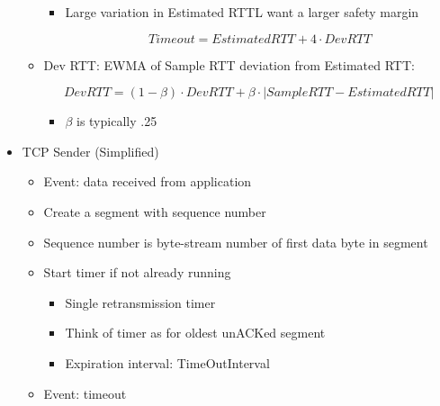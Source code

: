 \begin{itemize}
\begin{itemize}
        \begin{itemize}

          \item Large variation in Estimated RTTL want a larger safety margin

            $$Timeout=EstimatedRTT + 4\cdot DevRTT$$

        \end{itemize}

      \item Dev RTT: EWMA of Sample RTT deviation from Estimated RTT:

        $$DevRTT=(1-\beta)\cdot DevRTT+\beta\cdot|SampleRTT-EstimatedRTT|$$

        \begin{itemize}

          \item $\beta$ is typically .25

        \end{itemize}

    \end{itemize}

  \item TCP Sender (Simplified)

    \begin{itemize}

      \item Event: data received from application

      \item Create a segment with sequence number

      \item Sequence number is byte-stream number of first data byte in segment

      \item Start timer if not already running

        \begin{itemize}

          \item Single retransmission timer

          \item Think of timer as for oldest unACKed segment

          \item Expiration interval: TimeOutInterval

        \end{itemize}

      \item Event: timeout


\end{itemize}
\end{itemize}
